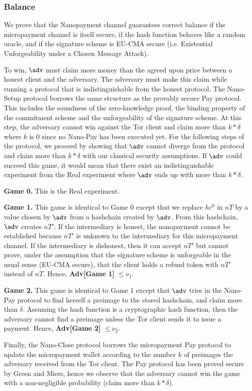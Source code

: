 \subsubsection{Balance}

We prove that the Nanopayment channel guarantees correct balance if the micropayment channel is itself secure, if the hash function behaves like a random oracle, and if the signature scheme is EU-CMA secure (i.e. Existential Unforgeability under a Chosen Message Attack).

To win, $\adv$ must claim more money than the agreed upon price between a honest client and the adversary. The adversary must make this claim while running a protocol that is indistinguishable from the honest protocol. The Nano-Setup protocol borrows the same structure as the provably secure Pay protocol. This includes the soundness of the zero-knowledge proof, the binding property of the commitment scheme and the unforgeability of the signature scheme. At this step, the adversary cannot win against the Tor client and claim more than $k*\delta$ where $k$ is 0 since no Nano-Pay has been executed yet. For the following steps of the protocol, we proceed by showing that $\adv$ cannot diverge from the protocol and claim more than $k*\delta$ with our classical security assumptions. If $\adv$ could succeed this game, it would mean that there exist an indistinguishable experiment from the Real experiment where $\adv$ ends up with more than $k*\delta$.

\textbf{Game 0.} This is the Real experiment.

\textbf{Game 1.} This game is identical to Game 0 except that we replace $hc^0$ in $nT$ by a value chosen by $\adv$ from a hashchain created by $\adv$. From this hashchain, $\adv$ creates $nT'$. If the intermediary is honest, the nanopayment cannot be established because $nT'$ is unknown to the intermediary for this micropayment channel. If the intermediary is dishonest, then it can accept $nT'$ but cannot prove, under the assumption that the signature scheme is unforgeable in the usual sense (EU-CMA secure), that the client holds a refund token with $nT'$ instead of $nT$. Hence, \textbf{Adv[Game 1]} $\leq \nu_1$.

\textbf{Game 2.} This game is identical to Game 1 except that $\adv$ tries in the Nano-Pay protocol to find herself a preimage to the stored hashchain, and claim more than $\delta$. Assuming the hash function is a cryptographic hash function, then the adversary cannot find a preimage unless the Tor client sends it to issue a payment. Hence, \textbf{Adv[Game 2]} $\leq \nu_2$.

Finally, the Nano-Close protocol borrows the micropayment Pay protocol to update the micropayment wallet according to the number $k$ of preimages the adversary received from the Tor client. The Pay protocol has been proved secure by Green and Miers, hence we observe that the adversary cannot win the game with a non-negligible probability (claim more than $k*\delta$).

